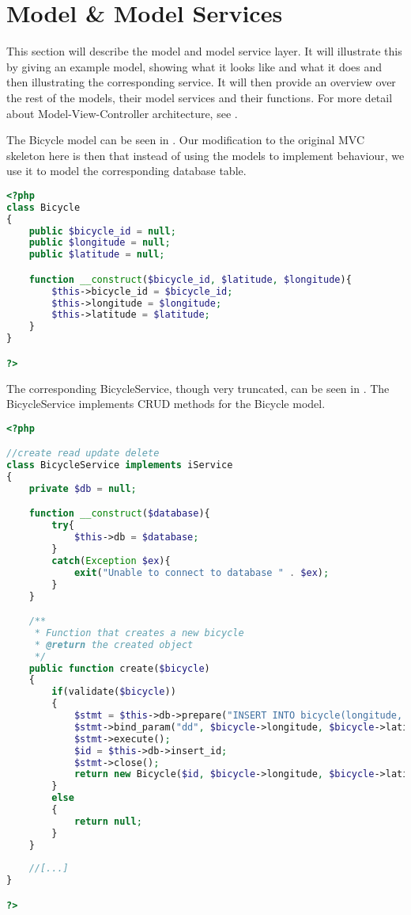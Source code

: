 \section{Model \& Model Services}
This section will describe the model and model service layer.
It will illustrate this by giving an example model, showing what it looks like and what it does and then illustrating the corresponding service.
It will then provide an overview over the rest of the models, their model services and their functions.
For more detail about Model-View-Controller architecture, see .

The Bicycle model can be seen in . Our modification to the original MVC skeleton here is then that instead of using the models to implement behaviour, we use it to model the corresponding database table.

\begin{minipage}{\textwidth}
\begin{lstlisting}[language=php, label=lst:bicycleModel, caption={Bicycle Class}]
<?php
class Bicycle
{
    public $bicycle_id = null;
    public $longitude = null;
    public $latitude = null;

    function __construct($bicycle_id, $latitude, $longitude){
        $this->bicycle_id = $bicycle_id;
        $this->longitude = $longitude;
        $this->latitude = $latitude;
    }
}

?>
\end{lstlisting}
\end{minipage}

The corresponding BicycleService, though very truncated, can be seen in . The BicycleService implements CRUD methods for the Bicycle model.

\begin{lstlisting}[language=php, label=lst:bicycleService, caption={BicycleService Class}]
<?php

//create read update delete
class BicycleService implements iService
{
    private $db = null;

    function __construct($database){
        try{
            $this->db = $database;
        }
        catch(Exception $ex){
            exit("Unable to connect to database " . $ex);
        }
    }

    /**
     * Function that creates a new bicycle
     * @return the created object
     */
    public function create($bicycle)
    {
        if(validate($bicycle))
        {
            $stmt = $this->db->prepare("INSERT INTO bicycle(longitude, latitude) VALUES (?,?)");
            $stmt->bind_param("dd", $bicycle->longitude, $bicycle->latitude);
            $stmt->execute();
            $id = $this->db->insert_id;
            $stmt->close();
            return new Bicycle($id, $bicycle->longitude, $bicycle->latitude);\fxwarning{Erstattet nulls med longitude and latitude.}
        }
        else
        {
            return null;
        }
    }
    
    //[...]
}

?>
\end{lstlisting}

